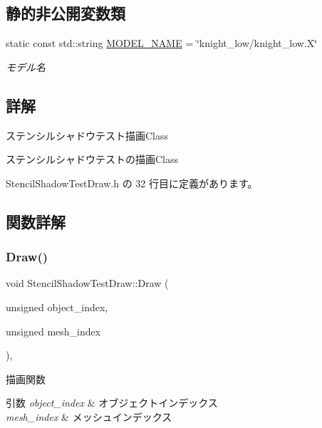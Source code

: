 \subsection*{静的非公開変数類}
\begin{DoxyCompactItemize}
\item 
static const std\+::string \mbox{\hyperlink{class_stencil_shadow_test_draw_a1ef49214f41a9fa1f3c2a7616eaf5655}{M\+O\+D\+E\+L\+\_\+\+N\+A\+ME}} = \char`\"{}knight\+\_\+low/knight\+\_\+low.\+X\char`\"{}
\begin{DoxyCompactList}\small\item\em モデル名 \end{DoxyCompactList}\end{DoxyCompactItemize}


\subsection{詳解}
ステンシルシャドウテスト描画\+Class 

ステンシルシャドウテストの描画\+Class 

 Stencil\+Shadow\+Test\+Draw.\+h の 32 行目に定義があります。



\subsection{関数詳解}
\mbox{\label{class_stencil_shadow_test_draw_abb5f9445b7d94c213a3751fa57e36643}} 
\subsubsection{\texorpdfstring{Draw()}{Draw()}}
{\footnotesize\ttfamily void Stencil\+Shadow\+Test\+Draw\+::\+Draw (\begin{DoxyParamCaption}\item[{unsigned}]{object\+\_\+index,  }\item[{unsigned}]{mesh\+\_\+index }\end{DoxyParamCaption})\hspace{0.3cm}{\ttfamily [override]}, {\ttfamily [virtual]}}



描画関数 


\begin{DoxyParams}{引数}
{\em object\+\_\+index} & オブジェクトインデックス \\
\hline
{\em mesh\+\_\+index} & メッシュインデックス \\
\hline
\end{DoxyParams}

